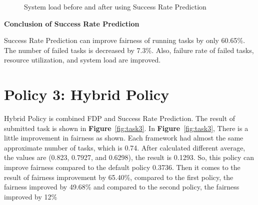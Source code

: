 \documentclass[12pt,oneside,openright,a4paper]{cpe-english-project}
\begin{document}
\begin{enumerate}
\begin{figure}[!h]\centering
    \setlength{\fboxrule}{0mm} %
    \setlength{\fboxsep}{0cm}
    \caption{System load before and after using Success Rate Prediction}\label{fig:load2}
\end{figure}
\end{enumerate}

\textbf{Conclusion of Success Rate Prediction}
\newline

\hspace{10mm}Success Rate Prediction can improve fairness of running tasks by only 60.65\%. The number of failed tasks is decreased by 7.3\%. Also, failure rate of failed tasks, resource utilization, and system load are improved.

\section{Policy 3: Hybrid Policy}

\hspace{10mm}Hybrid Policy is combined FDP and Success Rate Prediction. The result of submitted task is shown in \textbf{Figure}~\ref{fig:task3}. In \textbf{Figure}~\ref{fig:task3}, There is a little improvement in fairness as shown. Each framework had almost the same approximate number of tasks, which is 0.74. After calculated different average, the values are (0.823, 0.7927, and 0.6298), the result is 0.1293. So, this policy can improve fairness compared to the default policy 0.3736. Then it comes to the result of fairness improvement by 65.40\%, compared to the first policy, the fairness improved by 49.68\% and compared to the second policy, the fairness improved by 12\%
\newpage
\end{document}
